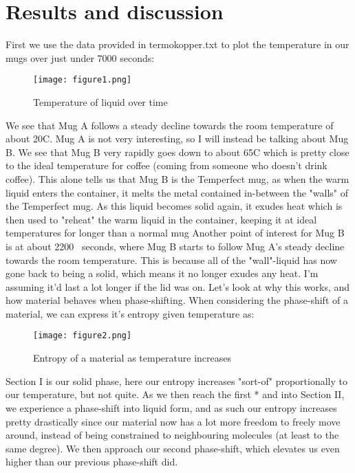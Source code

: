 \documentclass{article}
\begin{document}
\section{Results and discussion}
First we use the data provided in termokopper.txt to plot the temperature in our mugs over just under 7000 seconds:
\begin{figure}[ht]
    \centering
    \texttt{[image: figure1.png]}
    \caption{Temperature of liquid over time}
    \label{fig:1}
\end{figure}
\newpage
We see that Mug A follows a steady decline towards the room temperature of about 20\degree C. Mug A is not very interesting, so I will instead be talking about Mug B.\newline
We see that Mug B very rapidly goes down to about 65\degree C which is pretty close to the ideal temperature for coffee (coming from someone who doesn't drink coffee). This alone tells us that Mug B is the Temperfect mug, as when the warm liquid enters the container, it melts the metal contained in-between the "walls" of the Temperfect mug. As this liquid becomes solid again, it exudes heat which is then used to "reheat" the warm liquid in the container, keeping it at ideal temperatures for longer than a normal mug
\newline
Another point of interest for Mug B is at about 2200~ seconds, where Mug B starts to follow Mug A's steady decline towards the room temperature. This is because all of the "wall"-liquid has now gone back to being a solid, which means it no longer exudes any heat. I'm assuming it'd last a lot longer if the lid was on.
\newline
Let's look at why this works, and how material behaves when phase-shifting.
When considering the phase-shift of a material, we can express it's entropy given temperature as:
\begin{figure}[ht]
    \centering
    \texttt{[image: figure2.png]}
    \caption{Entropy of a material as temperature increases}
    \label{fig:2}
\end{figure}
\newline
Section I is our solid phase, here our entropy increases "sort-of" proportionally to our temperature, but not quite. As we then reach the first * and into Section II, we experience a phase-shift into liquid form, and as such our entropy increases pretty drastically since our material now has a lot more freedom to freely move around, instead of being constrained to neighbouring molecules (at least to the same degree). We then approach our second phase-shift, which elevates us even higher than our previous phase-shift did.
\end{document}
